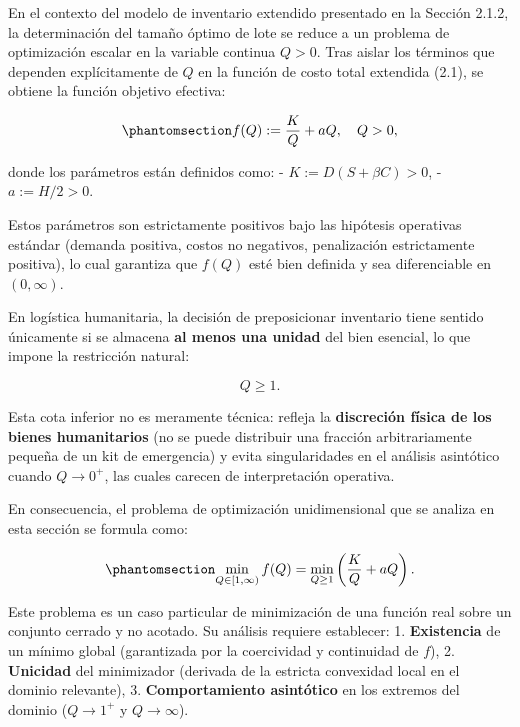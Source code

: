 \documentclass[
  spanish,
  us-letterpaper,
  DIV=11,
  numbers=noendperiod]{scrreprt}
\numberwithin{equation}{section}
\begin{document}
En el contexto del modelo de inventario extendido presentado en la
Sección 2.1.2, la determinación del tamaño óptimo de lote se reduce a un
problema de optimización escalar en la variable continua \(Q > 0\). Tras
aislar los términos que dependen explícitamente de \(Q\) en la función
de costo total extendida (2.1), se obtiene la función objetivo efectiva:

\begin{equation}\phantomsection\label{eq-fQ_25}{
f(Q) := \frac{K}{Q} + a Q, \quad Q > 0,
}\end{equation}

donde los parámetros están definidos como: -
\(K := D(S + \beta C) > 0\), - \(a := H/2 > 0\).

Estos parámetros son estrictamente positivos bajo las hipótesis
operativas estándar (demanda positiva, costos no negativos, penalización
estrictamente positiva), lo cual garantiza que \(f(Q)\) esté bien
definida y sea diferenciable en \((0, \infty)\).

En logística humanitaria, la decisión de preposicionar inventario tiene
sentido únicamente si se almacena \textbf{al menos una unidad} del bien
esencial, lo que impone la restricción natural:

\[
Q \geq 1.
\]

Esta cota inferior no es meramente técnica: refleja la
\textbf{discreción física de los bienes humanitarios} (no se puede
distribuir una fracción arbitrariamente pequeña de un kit de emergencia)
y evita singularidades en el análisis asintótico cuando \(Q \to 0^+\),
las cuales carecen de interpretación operativa.

En consecuencia, el problema de optimización unidimensional que se
analiza en esta sección se formula como:

\begin{equation}\phantomsection\label{eq-pou}{
\min_{Q \in [1, \infty)} f(Q) = \min_{Q \geq 1} \left( \frac{K}{Q} + a Q \right).
}\end{equation}

Este problema es un caso particular de minimización de una función real
sobre un conjunto cerrado y no acotado. Su análisis requiere establecer:
1. \textbf{Existencia} de un mínimo global (garantizada por la
coercividad y continuidad de \(f\)), 2. \textbf{Unicidad} del
minimizador (derivada de la estricta convexidad local en el dominio
relevante), 3. \textbf{Comportamiento asintótico} en los extremos del
dominio (\(Q \to 1^+\) y \(Q \to \infty\)).
\end{document}
